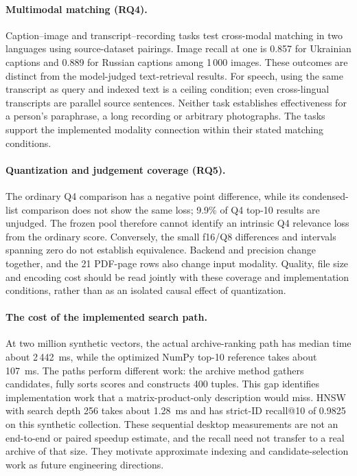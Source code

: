 \paragraph{Multimodal matching (RQ4).}
Caption--image and transcript--recording tasks test cross-modal matching in two languages using source-dataset pairings. Image recall at one is 0.857 for Ukrainian captions and 0.889 for Russian captions among 1\,000 images. These outcomes are distinct from the model-judged text-retrieval results. For speech, using the same transcript as query and indexed text is a ceiling condition; even cross-lingual transcripts are parallel source sentences. Neither task establishes effectiveness for a person's paraphrase, a long recording or arbitrary photographs. The tasks support the implemented modality connection within their stated matching conditions.

\paragraph{Quantization and judgement coverage (RQ5).}
The ordinary Q4 comparison has a negative point difference, while its condensed-list comparison does not show the same loss; 9.9\% of Q4 top-10 results are unjudged. The frozen pool therefore cannot identify an intrinsic Q4 relevance loss from the ordinary score. Conversely, the small f16/Q8 differences and intervals spanning zero do not establish equivalence. Backend and precision change together, and the 21 PDF-page rows also change input modality. Quality, file size and encoding cost should be read jointly with these coverage and implementation conditions, rather than as an isolated causal effect of quantization.

\paragraph{The cost of the implemented search path.}
At two million synthetic vectors, the actual archive-ranking path has median time about 2\,442~ms, while the optimized NumPy top-10 reference takes about 107~ms. The paths perform different work: the archive method gathers candidates, fully sorts scores and constructs 400 tuples. This gap identifies implementation work that a matrix-product-only description would miss. HNSW with search depth 256 takes about 1.28~ms and has strict-ID recall@10 of 0.9825 on this synthetic collection. These sequential desktop measurements are not an end-to-end or paired speedup estimate, and the recall need not transfer to a real archive of that size. They motivate approximate indexing and candidate-selection work as future engineering directions.

